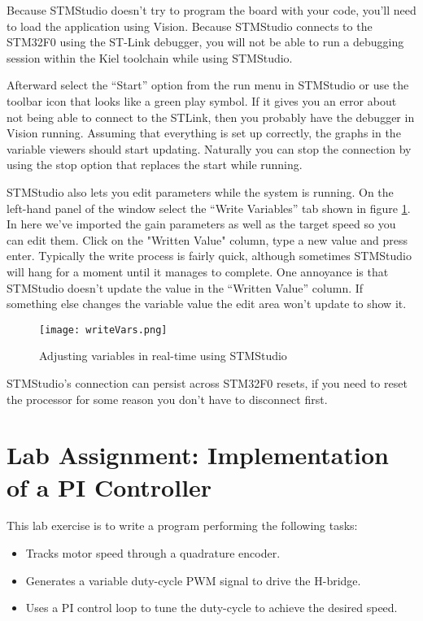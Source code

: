 \documentclass[openany,11pt,fleqn]{book} %
\begin{document}
\noindent Because STMStudio doesn't try to program the board with your code, you'll need to load the application using {\textmu}Vision. Because STMStudio connects to the STM32F0 using the ST-Link debugger, you will not be able to run a debugging session within the Kiel toolchain while using STMStudio. 

\noindent Afterward select the ``Start'' option from the run menu in STMStudio or use the toolbar icon that looks like a green play symbol. If it gives you an error about not being able to connect to the STLink, then you probably have the debugger in {\textmu}Vision running. Assuming that everything is set up correctly, the graphs in the variable viewers should start updating. Naturally you can stop the connection by using the stop option that replaces the start while running.

STMStudio also lets you edit parameters while the system is running. On the left-hand panel of the window select the ``Write Variables'' tab shown in figure \ref{writeVars}. In here we've imported the gain parameters as well as the target speed so you can edit them. Click on the "Written Value" column, type a new value and press enter. Typically the write process is fairly quick, although sometimes STMStudio will hang for a moment until it manages to complete. One annoyance is that STMStudio doesn't update the value in the ``Written Value'' column. If something else changes the variable value the edit area won't update to show it. 


\begin{figure}[tb]
    \centering\texttt{[image: writeVars.png]}
    \caption{Adjusting variables in real-time using STMStudio}
    \label{writeVars}
\end{figure}

STMStudio's connection can persist across STM32F0 resets, if you need to reset the processor for some reason you don't have to disconnect first.


\newpage
\section{Lab Assignment: Implementation of a PI Controller}

This lab exercise is to write a program performing the following tasks:
\begin{itemize}
    \item Tracks motor speed through a quadrature encoder.
    \item Generates a variable duty-cycle PWM signal to drive the H-bridge.
    \item Uses a PI control loop to tune the duty-cycle to achieve the desired speed.
\end{itemize}
\end{document}
